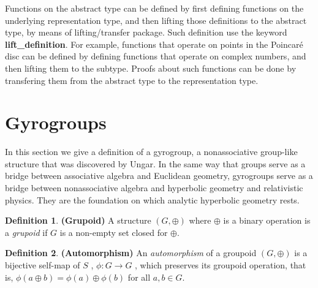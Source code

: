 \documentclass[a4paper]{article}
\theoremstyle{definition}
\newtheorem{definition}{Definition}[section]
\begin{document}
Functions on the abstract type can be defined by first defining
functions on the underlying representation type, and then lifting
those definitions to the abstract type, by means of lifting/transfer
package\cite{isabelle-lifting-transfer}. Such definition use the
keyword \textbf{lift\_definition}. For example, functions that operate
on points in the Poincar\'e disc can be defined by defining functions
that operate on complex numbers, and then lifting them to the subtype.
Proofs about such functions can be done by transfering them from the
abstract type to the representation type.

\section{Gyrogroups}\label{sec:gyrogroups}

In this section we give a definition of a gyrogroup, a nonassociative
group-like structure that was discovered by
Ungar\cite{ungar-analytic}. In the same way that groups serve as a
bridge between associative algebra and Euclidean geometry, gyrogroups
serve as a bridge between nonassociative algebra and hyperbolic
geometry and relativistic physics. They are the foundation on which
analytic hyperbolic geometry rests.

\begin{definition} \textbf{(Grupoid)} A structure $(G, \oplus)$ where
  $\oplus$ is a binary operation is a \emph{grupoid} if $G$ is a
  non-empty set closed for $\oplus$.
\end{definition}

\begin{definition} \textbf{(Automorphism)} An \emph{automorphism} of a
  groupoid $(G , \oplus)$ is a bijective self-map of $S$ ,
  $ \phi: G \rightarrow G$ , which preserves its groupoid operation,
  that is, $\phi (a\oplus b) = \phi (a) \oplus \phi (b)$ for all
  $a, b\in G$.
\end{definition}
\end{document}
